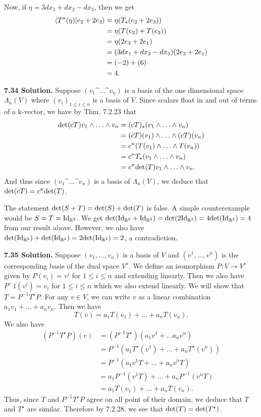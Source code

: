 Now, if $\eta = 3dx_1 + dx_2 - dx_3$, then we get
\begin{align*}
    \langle T^\star(\eta) | e_2 + 2e_3\rangle &= \eta(T_\star(e_2 + 2e_3)) \\
    &= \eta(T(e_2) + T(e_3)) \\
    &= \eta(2e_3 + 2e_1) \\
    &= (3dx_1 + dx_2 - dx_3)(2e_3 + 2e_1) \\
    &= (-2) + (6) \\
    &= 4.
\end{align*}

\textbf{7.34 Solution.} Suppose $(v_1 \^ \dots \^ v_n)$ is a basis of the one dimensional space $\Lambda_n(V)$ where $(v_i)_{1 \leq i \leq n}$ is a basis of $V$. Since scalars float in and out of terms of a k-vector, we have by Thm. 7.2.23 that
\begin{align*}
    \f{det}(cT)v_1 \^ \dots \^ v_n &= (cT)_\star(v_1 \^ \dots \^ v_n) \\
    &= (cT)(v_1) \^ \dots \^ (cT)(v_n) \\
    &= c^n(T(v_1) \^ \dots \^ T(v_n)) \\
    &= c^nT_\star(v_1 \^ \dots \^ v_n) \\
    &= c^n\f{det}(T)v_1 \^ \dots \^ v_n.
\end{align*}
And thus since $(v_1 \^ \dots \^ v_n)$ is a basis of $\Lambda_n(V)$, we deduce that $\text{det}(cT) = c^n\text{det}(T)$.

The statement $\text{det}(S + T) = \text{det}(S) + \text{det}(T)$ is false. A simple counterexample would be $S = T = \text{Id}_{\mathbb{R}^2}$. We get $\text{det}(\text{Id}_{\mathbb{R}^2} + \text{Id}_{\mathbb{R}^2}) =\text{det}(2\text{Id}_{\mathbb{R}^2}) = 4\text{det}(\text{Id}_{\mathbb{R}^2}) = 4$ from our result above. However, we also have $\text{det}(\text{Id}_{\mathbb{R}^2}) + \text{det}(\text{Id}_{\mathbb{R}^2}) = 2\text{det}(\text{Id}_{\mathbb{R}^2}) = 2$, a contradiction.

\textbf{7.35 Solution.} Suppose $(v_1, \dots, v_n)$ is a basis of $V$ and $(v^1, \dots, v^n)$ is the corresponding basis of the dual space $V^\star$. We define an isomorphism $P:V \to V^\star$ given by $P(v_i) = v^i$ for $1 \leq i \leq n$ and extending linearly. Then we also have $P^-1(v^i) = v_i$ for $1 \leq i \leq n$ which we also extend linearly. We will show that $T = P^{-1} T^\star P$. For any $v \in V$, we can write $v$ as a linear combination $a_1v_1 + \dots + a_nv_n$. Then we have
\[
T(v) = a_1T(v_1) + \dots + a_nT(v_n).
\]
We also have
\begin{align*}
    (P^{-1} T^\star P)(v) &= (P^{-1} T^\star)(a_1v^1 + \dots a_nv^n) \\
    &= P^{-1}(a_1T^\star(v^1) + \dots + a_nT^\star(v^n)) \\
    &= P^{-1}(a_1v^1T + \dots + a_nv^nT) \\
    &= a_1P^{-1}(v^1T) + \dots + a_nP^{-1}(v^nT) \\
    &= a_1T(v_1) + \dots + a_nT(v_n).
\end{align*}
Thus, since $T$ and $P^{-1} T^\star P$ agree on all point of their domain, we deduce that $T$ and $T^\star$ are similar. Therefore by 7.2.28, we see that $\text{det}(T) = \text{det}(T^\star)$.

